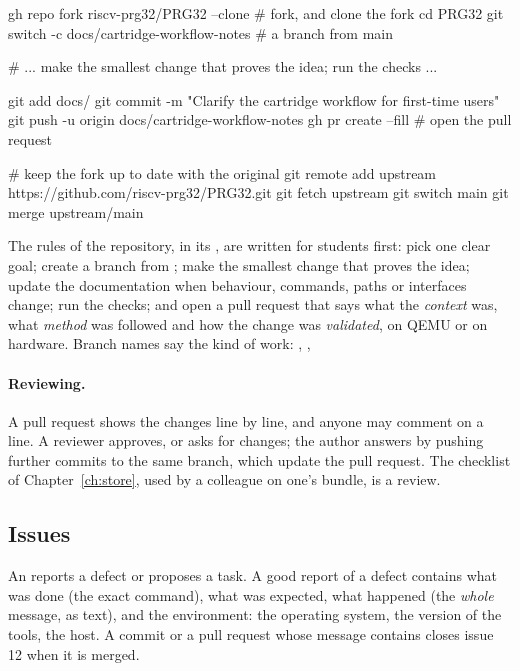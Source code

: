 \begin{shell}[caption={A contribution to \prg, from the fork to the pull request.},label=lst:git:pr]
gh repo fork riscv-prg32/PRG32 --clone       # fork, and clone the fork
cd PRG32
git switch -c docs/cartridge-workflow-notes  # a branch from main

# ... make the smallest change that proves the idea; run the checks ...

git add docs/
git commit -m "Clarify the cartridge workflow for first-time users"
git push -u origin docs/cartridge-workflow-notes
gh pr create --fill                          # open the pull request

# keep the fork up to date with the original
git remote add upstream https://github.com/riscv-prg32/PRG32.git
git fetch upstream
git switch main
git merge upstream/main
\end{shell}

The rules of the \prg repository, in its , are written
for students first: pick one clear goal; create a branch from ;
make the smallest change that proves the idea; update the documentation when
behaviour, commands, paths or interfaces change; run the checks; and open a
pull request that says what the \emph{context} was, what \emph{method} was
followed and how the change was \emph{validated}, on QEMU or on hardware.
Branch names say the kind of work: , ,

\paragraph{Reviewing.} A pull request shows the changes line by line, and
anyone may comment on a line. A reviewer approves, or asks for changes; the
author answers by pushing further commits to the same branch, which update
the pull request. The checklist of Chapter~\ref{ch:store}, used by a
colleague on one's bundle, is a review.

\subsection{Issues}

An  reports a defect or proposes a task. A good report of a
defect contains what was done (the exact command), what was expected, what
happened (the \emph{whole} message, as text), and the environment: the
operating system, the version of the tools, the host. A commit or a pull
request whose message contains  closes issue 12 when it is
merged.

